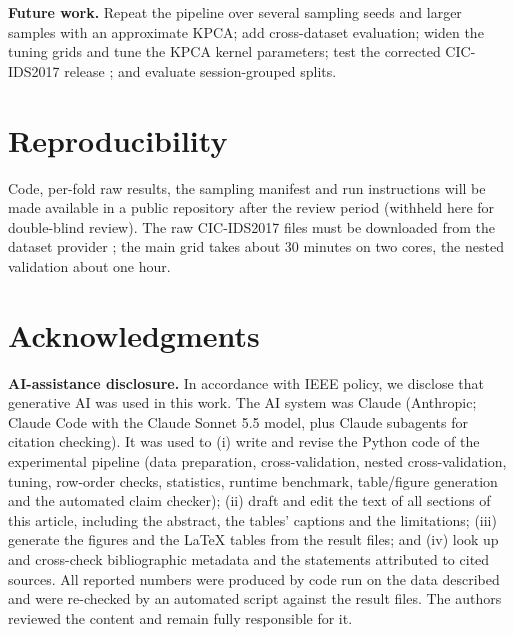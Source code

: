 \documentclass[conference]{IEEEtran}
\begin{document}
\textbf{Future work.} Repeat the pipeline over several sampling seeds and larger samples with an approximate KPCA; add cross-dataset evaluation; widen the tuning grids and tune the KPCA kernel parameters; test the corrected CIC-IDS2017 release \cite{engelen2021}; and evaluate session-grouped splits.

\section*{Reproducibility}
Code, per-fold raw results, the sampling manifest and run instructions will be made available in a public repository after the review period (withheld here for double-blind review). The raw CIC-IDS2017 files must be downloaded from the dataset provider \cite{sharafaldin2018}; the main grid takes about 30 minutes on two cores, the nested validation about one hour.

\section*{Acknowledgments}
\textbf{AI-assistance disclosure.} In accordance with IEEE policy, we disclose that generative AI was used in this work. The AI system was Claude (Anthropic; Claude Code with the Claude Sonnet 5.5 model, plus Claude subagents for citation checking). It was used to (i) write and revise the Python code of the experimental pipeline (data preparation, cross-validation, nested cross-validation, tuning, row-order checks, statistics, runtime benchmark, table/figure generation and the automated claim checker); (ii) draft and edit the text of all sections of this article, including the abstract, the tables' captions and the limitations; (iii) generate the figures and the LaTeX tables from the result files; and (iv) look up and cross-check bibliographic metadata and the statements attributed to cited sources. All reported numbers were produced by code run on the data described and were re-checked by an automated script against the result files. The authors reviewed the content and remain fully responsible for it.


\end{document}
